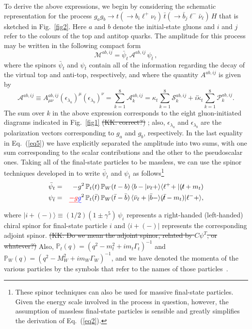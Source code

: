 \documentclass[aps,preprint,tightenlines,floatfix,superscriptaddress,nofootinbib,showpacs]{revtex4-1}
\def\beq{\begin{equation}}
\def\eeq{\end{equation}}
\def\bea{\begin{eqnarray}}
\def\eea{\end{eqnarray}}
\def\tbslash{\tbar\hspace{-10pt}\not{}\hspace{4pt}}
\def\tslash{t\hspace{-10pt}\not{}\hspace{4pt}}
\def\tbar{\bar{t}}
\def\bbar{\bar{b}}
\def\nubar{{\bar{\nu}}_{\ell}}
\def\kp{\kappa_t}
\def\kpt{\tilde{\kappa}_t}
\providecommand{\DIFadd}[1]{{\protect\color{blue}\uwave{#1}}} %
\providecommand{\DIFdel}[1]{{\protect\color{red}\sout{#1}}}                      %
\providecommand{\DIFaddbegin}{} %
\providecommand{\DIFaddend}{} %
\providecommand{\DIFdelbegin}{} %
\providecommand{\DIFdelend}{} %
\begin{document}
To derive the above expressions, we begin by considering the
schematic representation for the process $g_ag_b\to t(\to
b_i{\ell}^+\nu_{\ell})\,\tbar(\to \bbar_j {\ell}^- \nubar)\,H$
that is sketched in Fig.~\ref{fig2}.
Here $a$ and $b$ denote the initial-state gluons and
$i$ and $j$ refer to the colours of the top and antitop quarks.
%
The amplitude for this process may be written in the following
compact form
%
\beq
\label{eq6}
\mathcal{M}^{ab,ij}=\bar{\psi}_t\,\mathcal{A}^{ab,ij}\,\psi_{\tbar}\,,
\eeq
%
where the spinors $\bar{\psi}_t$ and $\psi_{\tbar}$
contain all of the information regarding the decay of the
virtual top and anti-top, respectively,
and where the quantity $A^{ab,ij}$ is given by
%
\beq
\label{eq5}
\mathcal{A}^{ab,ij}\equiv A^{ab,ij}_{\mu\nu}(\epsilon_{\lambda_a})^{\mu}(\epsilon_{\lambda_b})^{\nu}=\sum_{k=1}^8 \mathcal{A}^{ab,ij}_k =\kp \sum_{k=1}^8 \mathcal{S}^{ab,ij}_k + i\kpt \sum_{k=1}^8 \mathcal{P}^{ab,ij}_k.
\eeq 
%
The sum over $k$ in the above expression
corresponds to the eight gluon-initiated
diagrams indicated in Fig.~\ref{fig1}\DIFdelbegin %
\DIFdel{(KK: correct?)}%
\DIFdelend ; also,
$\epsilon_{\lambda_a}$ and $\epsilon_{\lambda_b}$ are the
polarization vectors corresponding to $g_a$ and $g_b$, respectively.
In the last equality in Eq.~(\ref{eq5})
we have explicitly separated the amplitude into
two sums, with one sum corresponding to the scalar contributions
and the other to the pseudoscalar ones.
Taking all of the final-state particles to be massless, we can use the
spinor techniques
developed in \cite{Kleiss} to write $\bar{\psi}_t$ and
$\psi_{\tbar}$ as follows\footnote{These spinor techniques can also be used
  for massive final-state particles. Given the
  energy scale involved in the process in question, however, the assumption
  of massless final-state particles is sensible and greatly
  simplifies the derivation of Eq.~(\ref{eq2}).}
%
\bea
\label{eq7}
\bar{\psi}_t &=& -g^2\, \mathbb{P}_t(t)\,\mathbb{P}_W(t-b)\,
   \langle b-|\nu_{\ell}+\rangle \langle {\ell}^+\!+|(\tslash+m_t)\\
\label{eq8}
\psi_{\tbar} &=& \DIFdelbegin \DIFdel{-g}\DIFdelend \DIFaddbegin \DIFadd{g}\DIFaddend ^2\, \mathbb{P}_t(\tbar)\,\mathbb{P}_W(\tbar-\bbar)\,
   \langle\nubar+|\bbar-\rangle (\tbslash-m_t)|{\ell}^-+\rangle,
\eea
%
where $|i+(-)\rangle \equiv (1/2)(1\pm \gamma^5)\,\psi_i$
represents a right-handed (left-handed) chiral spinor for final-state
particle $i$ and $\langle i+(-)|$ represents the corresponding adjoint spinor.
\DIFdelbegin %
\DIFdel{(KK: Do we mean the adjoint spinor, related by $C \psi^T$,
  or whatever?)}%
\DIFdelend Also, $\mathbb{P}_t(q)=(q^2-m^2_t+im_t\Gamma_t)^{-1}$ and
\DIFdelbegin \DIFdel{$\mathbb{P}_W(q)=(q^2-M^2_W+im_W\Gamma_W)^{-1}$}\DIFdelend \DIFaddbegin \DIFadd{$\mathbb{P}_W(q)=(q^2-m^2_W+im_W\Gamma_W)^{-1}$}\DIFaddend , and
we have denoted the momenta of the various particles by the symbols
that refer to the names of those particles~\cite{Mangano}.
\end{document}
